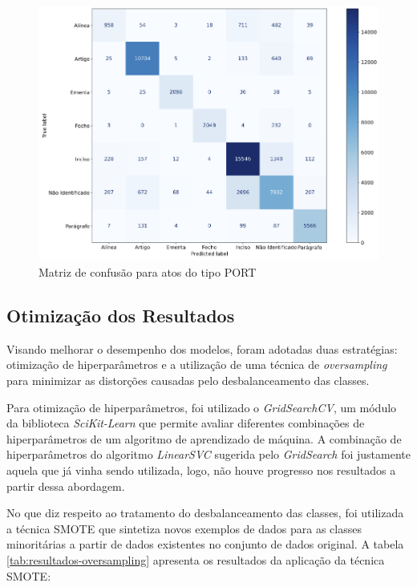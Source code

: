 \begin{figure}[h]
	\caption{Matriz de confusão para atos do tipo PORT}
	\center
	\label{fig:matriz-confusao-port}
	\includegraphics[scale=0.53]{resultados/matriz-confusao-port.png}
	\fdp
\end{figure}

\subsection{Otimização dos Resultados}

Visando melhorar o desempenho dos modelos, foram adotadas duas estratégias: otimização de hiperparâmetros e a utilização de uma técnica de \textit{oversampling} para minimizar as distorções causadas pelo desbalanceamento das classes.

Para otimização de hiperparâmetros, foi utilizado o \textit{GridSearchCV}, um módulo da biblioteca \textit{SciKit-Learn} que permite avaliar diferentes combinações de hiperparâmetros de um  algoritmo de aprendizado de máquina. A combinação de hiperparâmetros do algoritmo \textit{LinearSVC} sugerida pelo \textit{GridSearch} foi justamente aquela que já vinha sendo utilizada, logo, não houve progresso nos resultados a partir dessa abordagem.

No que diz respeito ao tratamento do desbalanceamento das classes, foi utilizada a técnica SMOTE\cite{Smote2002} que sintetiza novos exemplos de dados para as classes minoritárias a partir de dados existentes no conjunto de dados original. A tabela \ref{tab:resultados-oversampling} apresenta os resultados da aplicação da técnica SMOTE:

